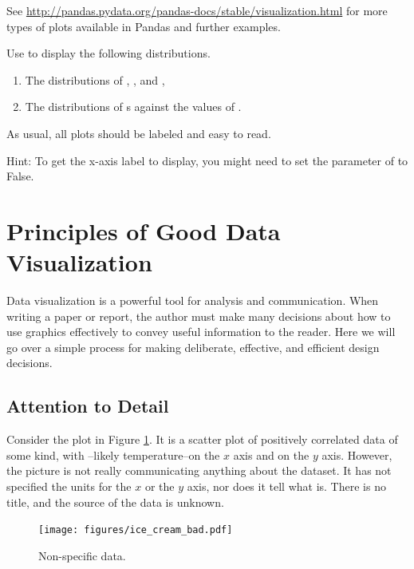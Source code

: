 See \url{http://pandas.pydata.org/pandas-docs/stable/visualization.html} for more types of plots available in Pandas and further examples.

\begin{problem}
Use  to display the following distributions.
\begin{enumerate}
        \item The distributions of , , and ,
        \item The distributions of s against the values of .
\end{enumerate}

As usual, all plots should be labeled and easy to read.

Hint: To get the x-axis label to display, you might need to set the  parameter of  to False.
\end{problem}

\section*{Principles of Good Data Visualization} %

Data visualization is a powerful tool for analysis and communication.
When writing a paper or report, the author must make many decisions about how to use graphics effectively to convey useful information to the reader.
Here we will go over a simple process for making deliberate, effective, and efficient design decisions.

\subsection*{Attention to Detail} %

Consider the plot in Figure \ref{fig:nolabels}.
It is a scatter plot of positively correlated data of some kind, with --likely temperature--on the $x$ axis and  on the $y$ axis.
However, the picture is not really communicating anything about the dataset.
It has not specified the units for the $x$ or the $y$ axis, nor does it tell what  is.
There is no title, and the source of the data is unknown.

\begin{figure}[H]
    \centering
    \texttt{[image: figures/ice\_cream\_bad.pdf]}
    \caption{Non-specific data.}
    \label{fig:nolabels}
\end{figure}

